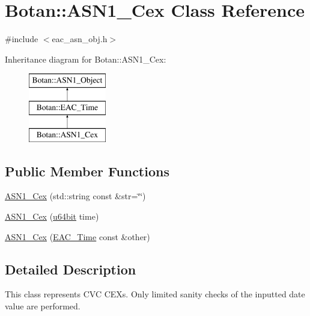 \hypertarget{classBotan_1_1ASN1__Cex}{\section{Botan\-:\-:A\-S\-N1\-\_\-\-Cex Class Reference}
\label{classBotan_1_1ASN1__Cex}
}


{\ttfamily \#include $<$eac\-\_\-asn\-\_\-obj.\-h$>$}

Inheritance diagram for Botan\-:\-:A\-S\-N1\-\_\-\-Cex\-:\begin{figure}[H]
\begin{center}
\leavevmode
\includegraphics[height=3.000000cm]{classBotan_1_1ASN1__Cex}
\end{center}
\end{figure}
\subsection*{Public Member Functions}
\begin{DoxyCompactItemize}
\item 
\hyperlink{classBotan_1_1ASN1__Cex_a36396f591adf5c17e14796f783275c97}{A\-S\-N1\-\_\-\-Cex} (std\-::string const \&str=\char`\"{}\char`\"{})
\item 
\hyperlink{classBotan_1_1ASN1__Cex_add8e4549d964cc71258c0fd25cac4d3f}{A\-S\-N1\-\_\-\-Cex} (\hyperlink{namespaceBotan_a634063d9fb05e25262ca94ed927030f6}{u64bit} time)
\item 
\hyperlink{classBotan_1_1ASN1__Cex_a73cbfffa755af6a711eed085fba89060}{A\-S\-N1\-\_\-\-Cex} (\hyperlink{classBotan_1_1EAC__Time}{E\-A\-C\-\_\-\-Time} const \&other)
\end{DoxyCompactItemize}


\subsection{Detailed Description}
This class represents C\-V\-C C\-E\-Xs. Only limited sanity checks of the inputted date value are performed. 

